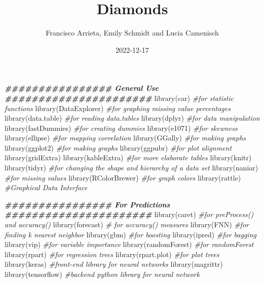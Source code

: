 \documentclass[
]{article}
\title{Diamonds}
\author{Francisco Arrieta, Emily Schmidt and Lucia Camenisch}
\date{2022-12-17}
\newenvironment{Shaded}{\begin{snugshade}}{\end{snugshade}}
\newcommand{\CommentTok}[1]{\textcolor[rgb]{0.56,0.35,0.01}{\textit{#1}}}
\newcommand{\DocumentationTok}[1]{\textcolor[rgb]{0.56,0.35,0.01}{\textbf{\textit{#1}}}}
\newcommand{\FunctionTok}[1]{\textcolor[rgb]{0.00,0.00,0.00}{#1}}
\newcommand{\NormalTok}[1]{#1}
\begin{document}
\maketitle

{
\setcounter{tocdepth}{2}
\tableofcontents
}
\begin{Shaded}
\begin{Highlighting}[]
\DocumentationTok{\#\#\#\#\#\#\#\#\#\#\#\#\#\#\#\# General Use \#\#\#\#\#\#\#\#\#\#\#\#\#\#\#\#\#\#\#\#\#\#}
\FunctionTok{library}\NormalTok{(car)            }\CommentTok{\#for statistic functions}
\FunctionTok{library}\NormalTok{(DataExplorer)   }\CommentTok{\#for graphing missing value percentages}
\FunctionTok{library}\NormalTok{(data.table)     }\CommentTok{\#for reading data.tables}
\FunctionTok{library}\NormalTok{(dplyr)          }\CommentTok{\#for data manipulation}
\FunctionTok{library}\NormalTok{(fastDummies)    }\CommentTok{\#for creating dummies}
\FunctionTok{library}\NormalTok{(e1071)          }\CommentTok{\#for skewness}
\FunctionTok{library}\NormalTok{(ellipse)        }\CommentTok{\#for mapping correlation}
\FunctionTok{library}\NormalTok{(GGally)         }\CommentTok{\#for making graphs}
\FunctionTok{library}\NormalTok{(ggplot2)        }\CommentTok{\#for making graphs}
\FunctionTok{library}\NormalTok{(ggpubr)         }\CommentTok{\#for plot alignment}
\FunctionTok{library}\NormalTok{(gridExtra)}
\FunctionTok{library}\NormalTok{(kableExtra)     }\CommentTok{\#for more elaborate tables}
\FunctionTok{library}\NormalTok{(knitr)}
\FunctionTok{library}\NormalTok{(tidyr)          }\CommentTok{\#for changing the shape and hierarchy of a data set}
\FunctionTok{library}\NormalTok{(naniar)         }\CommentTok{\#for missing values}
\FunctionTok{library}\NormalTok{(RColorBrewer)   }\CommentTok{\#for graph colors}
\FunctionTok{library}\NormalTok{(rattle)         }\CommentTok{\#Graphical Data Interface}


\DocumentationTok{\#\#\#\#\#\#\#\#\#\#\#\#\#\#\#\# For Predictions \#\#\#\#\#\#\#\#\#\#\#\#\#\#\#\#\#\#\#\#\#\#}
\FunctionTok{library}\NormalTok{(caret)          }\CommentTok{\#for preProcess() and accuracy()}
\FunctionTok{library}\NormalTok{(forecast)       }\CommentTok{\# for accuracy() measures}
\FunctionTok{library}\NormalTok{(FNN)            }\CommentTok{\#for finding k nearest neighbor}
\FunctionTok{library}\NormalTok{(gbm)            }\CommentTok{\#for boosting}
\FunctionTok{library}\NormalTok{(ipred)          }\CommentTok{\#for bagging}
\FunctionTok{library}\NormalTok{(vip)            }\CommentTok{\#for variable importance}
\FunctionTok{library}\NormalTok{(randomForest)   }\CommentTok{\#for randomForest}
\FunctionTok{library}\NormalTok{(rpart)          }\CommentTok{\#for regression trees}
\FunctionTok{library}\NormalTok{(rpart.plot)     }\CommentTok{\#for plot trees}
\FunctionTok{library}\NormalTok{(keras)          }\CommentTok{\#front{-}end library for neural networks}
\FunctionTok{library}\NormalTok{(magrittr)}
\FunctionTok{library}\NormalTok{(tensorflow)     }\CommentTok{\#backend python library for neural network}



\end{Highlighting}
\end{Shaded}
\end{document}
